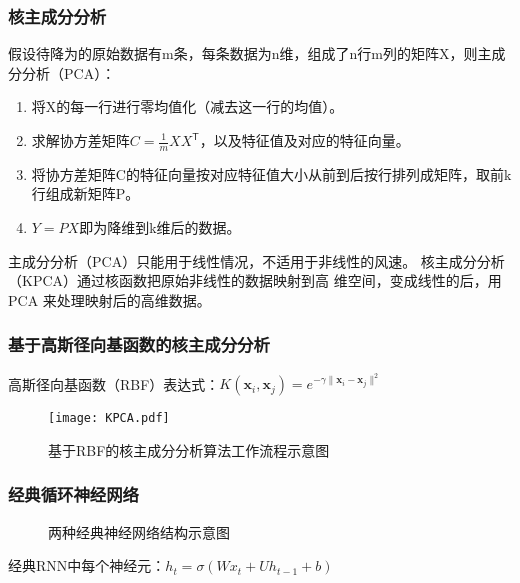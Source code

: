 \documentclass[14pt, AutoFakeBold]{ppt}
\begin{document}
\begin{frame}
  \frametitle{核主成分分析}
  假设待降为的原始数据有m条，每条数据为n维，组成了n行m列的矩阵X，则主成分分析（PCA）：
  \begin{enumerate}
    \item 将X的每一行进行零均值化（减去这一行的均值）。
    \item 求解协方差矩阵$C=\frac{1}{m}XX^\mathsf{T}$，以及特征值及对应的特征向量。
    \item 将协方差矩阵C的特征向量按对应特征值大小从前到后按行排列成矩阵，取前k行组成新矩阵P。
    \item $Y=PX$即为降维到k维后的数据。
  \end{enumerate}

  主成分分析（PCA）只能用于线性情况，不适用于非线性的风速。
  \rightline{}
  核主成分分析（KPCA）通过核函数把原始非线性的数据映射到高
  维空间，变成线性的后，用 PCA 来处理映射后的高维数据。
\end{frame}

\begin{frame}
  \frametitle{基于高斯径向基函数的核主成分分析}
  高斯径向基函数（RBF）表达式：$K(\mathbf x_i,\mathbf x_j)=e^{-\gamma\|\mathbf x_i-\mathbf x_j\|^2}$
  \begin{figure}[H]
    \centering
    \texttt{[image: KPCA.pdf]}
    \caption{基于RBF的核主成分分析算法工作流程示意图}
    \label{fig_kpca}
  \end{figure}
\end{frame}

\begin{frame}
  \frametitle{经典循环神经网络}
  \begin{figure}[H]
    \centering
    \caption{两种经典神经网络结构示意图}
    \label{fig_nn}
  \end{figure}
  经典RNN中每个神经元：$h_t=\sigma(Wx_t+Uh_{t-1}+b)$
\end{frame}
\end{document}
